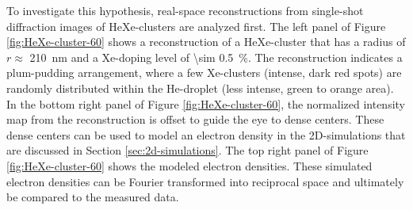 %
To investigate this hypothesis, real-space reconstructions from single-shot diffraction images of HeXe-clusters are analyzed first. The left panel of Figure \ref{fig:HeXe-cluster-60} shows a reconstruction of a HeXe-cluster that has a radius of $r\approx$ \SI{210}{\nano\meter} and a Xe-doping level of \SI{\sim 0.5}{\percent}. The reconstruction indicates a plum-pudding arrangement, where a few Xe-clusters (intense, dark red spots) are randomly distributed within the He-droplet (less intense, green to orange area). In the bottom right panel of Figure \ref{fig:HeXe-cluster-60}, the normalized intensity map from the reconstruction is offset to guide the eye to dense centers. These dense centers can be used to model an electron density in the 2D-simulations that are discussed in Section \ref{sec:2d-simulations}. The top right panel of Figure \ref{fig:HeXe-cluster-60} shows the modeled electron densities. These simulated electron densities can be Fourier transformed into reciprocal space and ultimately be compared to the measured data.\\[1\baselineskip]
%

